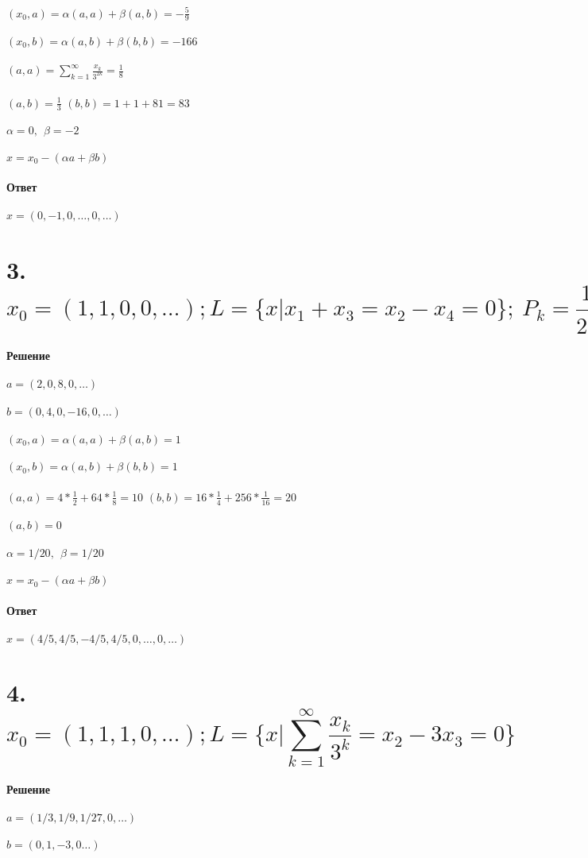 \documentclass{article}
\begin{document}
	
	$(x_0, a)=\alpha(a,a)+\beta(a,b)=-\frac{5}{9}$\\ \\
	$(x_0, b)=\alpha(a,b)+\beta(b,b)=-166$\\ \\
	$(a,a)=\sum_{k=1}^{\infty}\frac{x_k}{3^{2k}}=\frac{1}{8} $ \\ \\
	$(a,b)=\frac{1}{3}$
	$(b,b)=1+1+81=83 $\\ \\
	$\alpha=0,\ \ \beta=-2$\\ \\
	$x = x_0 - (\alpha a+\beta b)$\\ \\
	\textbf{Ответ}\\ \\
	$x=(0,-1,0,\dots,0,\dots)$
	
	
	\section*{3.
	$$x_0=(1,1,0,0,\dots); L=\{x|x_1+x_3=x_2-x_4=0 \};\ P_k=\frac{1}{2^k}$$}
	\textbf{Решение}\\ \\
	$a=(2,0,8,0,\dots)$\\ \\
	$b=(0,4,0,-16,0,\dots)$\\ \\
		
		$(x_0, a)=\alpha(a,a)+\beta(a,b)=1$\\ \\
		$(x_0, b)=\alpha(a,b)+\beta(b,b)=1$\\ \\
		$(a,a)=4*\frac{1}{2}+64*\frac{1}{8}=10 $
		$(b,b)=16*\frac{1}{4}+256*\frac{1}{16}=20$\\ \\
		$(a,b)=0$\\ \\
		$\alpha=1/20,\ \ \beta=1/20$\\ \\
		$x = x_0 - (\alpha a+\beta b)$\\ \\
		\textbf{Ответ}\\ \\
		$x=(4/5,4/5,-4/5,4/5,0,\dots,0,\dots)$
	
	
	\section*{4.
	$$x_0=(1,1,1,0,\dots); L=\{x|\sum_{k=1}^{\infty}\frac{x_k}{3^k}=x_2-3x_3=0 \}$$}
	\textbf{Решение}\\ \\
	$a=(1/3,1/9,1/27,0,\dots)$\\ \\
	$b=(0,1,-3,0\dots)$\\ \\
	
\end{document}
